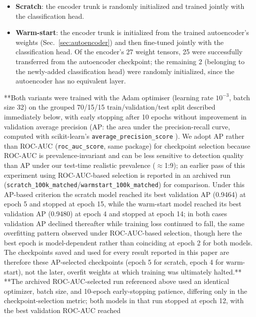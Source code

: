 \documentclass[preprint,NumberedRefs]{JASAnew}
\begin{document}
\begin{itemize}
    \item \textbf{Scratch}: the encoder trunk is randomly initialized and
    trained jointly with the classification head.
    \item \textbf{Warm-start}: the encoder trunk is initialized from the trained autoencoder's weights (Sec.~\ref{sec:autoencoder}) and then
    fine-tuned jointly with the classification head. Of the encoder's 27 weight tensors, 25 were successfully transferred from the autoencoder checkpoint; the remaining 2 (belonging to the newly-added classification head) were randomly initialized, since the autoencoder has no
    equivalent layer.
\end{itemize}

**Both variants were trained with the Adam optimiser (learning rate
$10^{-3}$, batch size 32) on the grouped 70/15/15 train/validation/test
split described immediately below, with early stopping after 10 epochs
without improvement in validation average precision (AP: the area under
the precision-recall curve, computed with scikit-learn's
\texttt{average\_precision\_score} \cite{pedregosa2011scikit}). We adopt
AP rather than ROC-AUC (\texttt{roc\_auc\_score}, same package) for
checkpoint selection because ROC-AUC is prevalence-invariant and can be
less sensitive to detection quality than AP under our test-time
realistic prevalence ($\approx$1:9); an earlier pass of this experiment
using ROC-AUC-based selection is reported in an archived run
(\texttt{scratch\_100k\_matched}/\texttt{warmstart\_100k\_matched}) for
comparison. Under this AP-based criterion the scratch model reached its
best validation AP (0.9464) at epoch 5 and stopped at epoch 15, while the
warm-start model reached its best validation AP (0.9480) at epoch 4 and
stopped at epoch 14; in both cases validation AP declined thereafter
while training loss continued to fall, the same overfitting pattern
observed under ROC-AUC-based selection, though here the best epoch is
model-dependent rather than coinciding at epoch 2 for both models. The
checkpoints saved and used for every result reported in this paper are
therefore these AP-selected checkpoints (epoch 5 for scratch, epoch 4 for
warm-start), not the later, overfit weights at which training was
ultimately halted.** **The archived ROC-AUC-selected run referenced above
used an identical optimizer, batch size, and 10-epoch early-stopping
patience, differing only in the checkpoint-selection metric; both models
in that run stopped at epoch 12, with the best validation ROC-AUC reached
\end{document}
